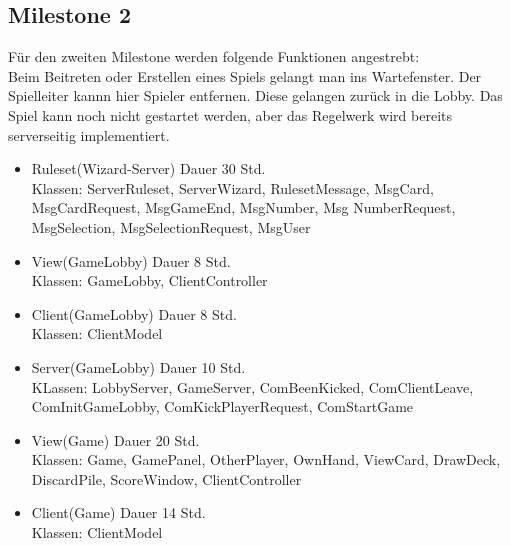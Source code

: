 \documentclass[twoside]{article}
\begin{document}
\subsection{Milestone 2}
Für den zweiten Milestone werden folgende Funktionen angestrebt:\\
Beim Beitreten oder Erstellen eines Spiels gelangt man ins Wartefenster. Der Spielleiter kannn hier Spieler entfernen. Diese gelangen zurück in die Lobby. Das Spiel kann noch nicht gestartet werden, aber das Regelwerk wird bereits serverseitig implementiert.\\
\begin{itemize}
\item Ruleset(Wizard-Server) Dauer 30 Std. \\
Klassen: ServerRuleset, ServerWizard, RulesetMessage, MsgCard, MsgCardRequest, MsgGameEnd, MsgNumber, Msg NumberRequest, MsgSelection, MsgSelectionRequest, MsgUser
\item View(GameLobby) Dauer 8 Std. \\
Klassen: GameLobby, ClientController
\item Client(GameLobby) Dauer 8 Std. \\
Klassen: ClientModel
\item Server(GameLobby) Dauer 10 Std. \\
KLassen: LobbyServer, GameServer, ComBeenKicked, ComClientLeave, ComInitGameLobby, ComKickPlayerRequest, ComStartGame
\item View(Game) Dauer 20 Std. \\
Klassen: Game, GamePanel, OtherPlayer, OwnHand, ViewCard, DrawDeck, DiscardPile, ScoreWindow, ClientController
\item Client(Game) Dauer 14 Std. \\
Klassen: ClientModel
\end{itemize}
\end{document}
